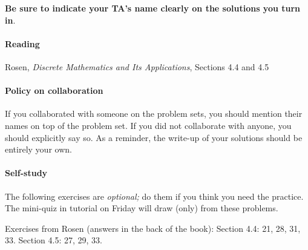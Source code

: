 \documentclass[11pt, twoside]{article}
\begin{document}
\renewcommand{\labelenumi}{\bf (\alph{enumi})}
\renewcommand{\labelenumii}{\bf (\roman{enumi})}
\textbf{Be sure to indicate your TA's name clearly on the solutions
you turn in}.

\paragraph{Reading}
Rosen, \textit{Discrete Mathematics and Its Applications},
Sections 4.4 and 4.5

\paragraph{Policy on collaboration}
If you collaborated with someone on the problem sets, you should
mention their names on top of the problem set. If you did not
collaborate with anyone, you should explicitly say so. As a reminder,
the write-up of your solutions should be entirely your own.

\paragraph{Self-study}
The following exercises are \emph{optional;} do them if you think you
need the practice. The mini-quiz in tutorial on Friday will draw
(only) from these problems.

Exercises from Rosen (answers in the back of the book): 
Section 4.4: 21, 28, 31, 33.
Section 4.5: 27, 29, 33.
\end{document}
